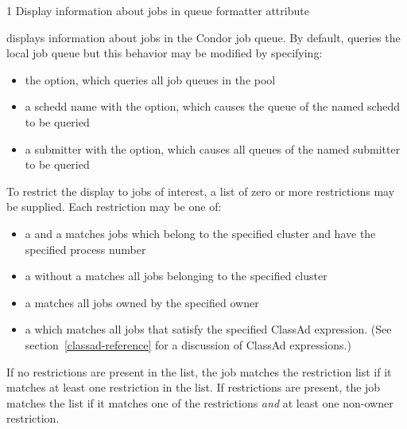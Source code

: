 \begin{ManPage}{\label{man-condor-q}}{1}
{Display information about jobs in queue}
\Synopsis {}
 {formatter attribute}


\Description
{} displays information about jobs in the Condor job queue.  By
default,  queries the local job queue but this behavior may be 
modified by specifying:
\begin{itemize}
	\item the  option, which queries all job queues in the pool
	\item a schedd name with the  option, which causes the queue of 
		the named schedd to be queried 
	\item a submitter with the  option, which causes all queues
		of the named submitter to be queried
\end{itemize}

To restrict the display to jobs of interest, a list of zero or more 
restrictions may be supplied.  Each restriction may be one of:
\begin{itemize}
	\item a  and a  matches jobs which
		belong to the specified cluster and have the specified process number
	\item a  without a  matches all jobs belonging
		to the specified cluster
	\item a  matches all jobs owned by the specified owner
	\item a  which matches all jobs that
		satisfy the specified ClassAd expression. (See section~\ref{classad-reference}
		for a discussion of ClassAd expressions.)
\end{itemize}
If no  restrictions are present in the list, the job matches the 
restriction list if it matches at least one restriction in the list.  If 
 restrictions are present, the job matches the list if it matches 
one of the  restrictions \emph{and} at least one non-owner 
restriction.


\end{ManPage}
